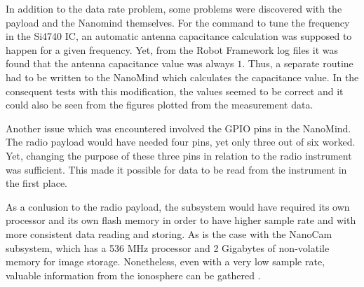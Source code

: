 \documentclass[english,12pt,a4paper,pdftex,elec,utf8]{aaltothesis}
\begin{document}
In addition to the data rate problem, some problems were discovered with the payload and the Nanomind themselves. For the command to tune the frequency in the Si4740 IC, an automatic antenna capacitance calculation was supposed to happen for a given frequency. Yet, from the Robot Framework log files it was found that the antenna capacitance value was always $1$. Thus, a separate routine had to be written to the NanoMind which calculates the capacitance value. In the consequent tests with this modification, the values seemed to be correct and it could also be seen from the figures plotted from the measurement data.\par 
Another issue which was encountered involved the GPIO pins in the NanoMind. The radio payload would have needed four pins, yet only three out of six worked. Yet, changing the purpose of these three pins in relation to the radio instrument was sufficient. This made it possible for data to be read from the instrument in the first place.\par 
As a conlusion to the radio payload, the subsystem would have required its own processor and its own flash memory in order to have higher sample rate and with more consistent data reading and storing. As is the case with the NanoCam subsystem, which has a 536 MHz processor and 2 Gigabytes of non-volatile memory for image storage. Nonetheless, even with a very low sample rate, valuable information from the ionosphere can be gathered \cite{esanpapru}.    
\end{document}
